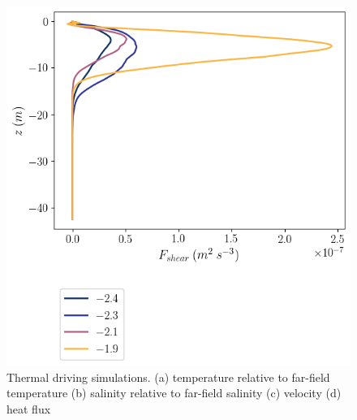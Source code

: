 \documentclass[draft]{styles/agujournal2019}
\begin{document}
\begin{figure}
\begin{minipage}{0.5\textwidth}
    \end{minipage}%
    \begin{minipage}{0.5\textwidth}
        \includegraphics[trim={0 7.5cm 0 0},clip, width=\textwidth]{Figures/Fshear_cmp_dT_48hr_tav1_z_profile.png}
    \end{minipage}
    \caption{Thermal driving simulations. (a) temperature relative to far-field temperature (b) salinity relative to far-field salinity (c) velocity (d) heat flux}
    \label{fig:dT_profiles}
\end{figure}
\end{document}
